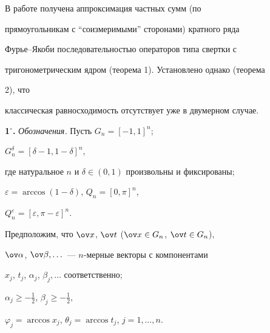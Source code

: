  


\date{} 




\pagestyle{plain} %


 




\maketitle 


\label{begin} 


 


 


В работе получена аппроксимация частных сумм (по 


прямоугольникам с ``соизмеримыми'' сторонами) кратного ряда 


Фурье--Якоби последовательностью операторов типа свертки с 


тригонометрическим ядром (теорема 1). Установлено однако (теорема 


2), что  


классическая равносходимость отсутствует уже в двумерном случае. 


\medskip 


 


 


{\bf 1${}^\circ$.} {\it Обозначения.} Пусть $G_n=[-1,1]^n$; 


$G^\delta_n=[\delta-1,1-\delta]^n$, 


где натуральное $n$ и $\delta\in(0,1)$ произвольны и фиксированы; 


$\varepsilon=\arccos(1-\delta)$, $Q_n=[0,\pi]^n$, 


$Q^\varepsilon_n=[\varepsilon,\pi-\varepsilon]^n$. 


Предположим, что $\ov x$, $\ov t$ ($\ov x\in G_n$, $\ov t\in G_n$), 


$\ov\alpha$, $\ov\beta,\dotsc$ --- $n$-мерные векторы с компонентами 


$x_j$, $t_j$, $\alpha_j$, $\beta_j,\dotsc$ соответственно; 


$\alpha_j\ge-\frac{1}{2}$, $\beta_j\ge-\frac{1}{2}$, 


$\varphi_j=\arccos x_j$, $\theta_j=\arccos t_j$, $j=1,\dotsc,n$. 


